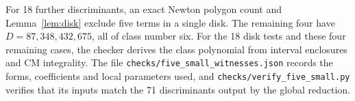 For 18 further discriminants, an exact Newton polygon count and Lemma~\ref{lem:disk} exclude five terms in a single disk. The remaining four have $D=87,348,432,675$, all of class number six. For the 18 disk tests and these four remaining cases, the checker derives the class polynomial from interval enclosures and CM integrality. The file \texttt{checks/five\_small\_witnesses.json} records the forms, coefficients and local parameters used, and \texttt{checks/verify\_five\_small.py} verifies that its inputs match the 71 discriminants output by the global reduction.

